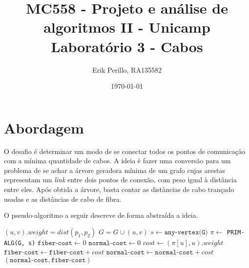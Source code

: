\documentclass[7pt]{article}
\newcommand{\tit}[1]{\textit{#1}}
\newcommand{\ttt}[1]{\texttt{#1}}
\begin{document}

\author{Erik Perillo, RA135582}
\date{\today}
\title{%
	{\small MC558 - Projeto e análise de algoritmos II - Unicamp}\\
	{\Large Laboratório 3 - Cabos}}
\maketitle\vspace{-0.5cm}
\posttitle{\par\end{center}}

\makeatletter
\def\BState{\State\hskip-\ALG@thistlm}
\makeatother


\section{Abordagem}
O desafio é determinar um modo de se conectar todos os pontos de comunicação
com a mínima quantidade de cabos.
A ideia é fazer uma conversão para um problema de se achar a árvore geradora
mínima de um grafo cujas arestas representam um \tit{link} entre dois pontos
de conexão, com peso igual à distância entre eles.
Após obtida a árvore, basta contar as distâncias de cabo trançado usadas
e as distâncias de cabo de fibra.

O pseudo-algoritmo a seguir descreve de forma abstraída a ideia.
\begin{algorithm}
\caption{}\label{Cabos}
\begin{algorithmic}[1]
        \State $(u, v).weight = dist(p_1, p_2)$
        \State $G = G \cup (u, v)$
	\EndFor
    \State $s \gets \ttt{any-vertex(G)}$
    \State $\pi \gets$ \ttt{PRIM-ALG(G, s)}
    \State $\ttt{fiber-cost} \gets 0$
    \State $\ttt{normal-cost} \gets 0$
        \State $cost \gets (\pi[u], u).weight$
        \If{$cost > \ttt{fiber-thresh}$}
            \State $\ttt{fiber-cost} \gets \ttt{fiber-cost} + cost$
        \Else
            \State $\ttt{normal-cost} \gets \ttt{normal-cost} + cost$
        \EndIf
	\EndFor
    \Return $(\ttt{normal-cost}, \ttt{fiber-cost})$
    \EndProcedure
\end{algorithmic}
\end{algorithm}
\end{document}

